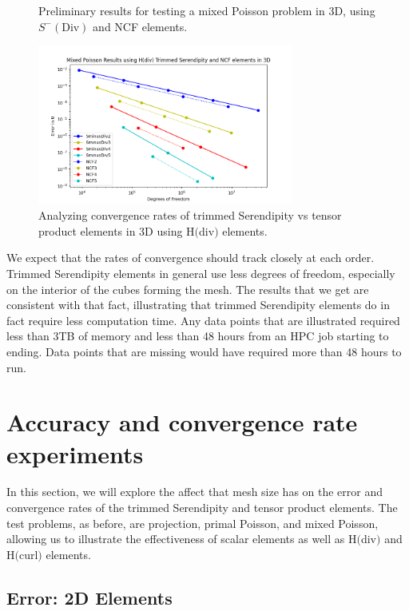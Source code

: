 \documentclass[manuscript,screen]{acmart}
\begin{document}
\begin{figure}[h!]
  \caption{Preliminary results for testing a mixed Poisson problem in 3D, using $S^-(\text{Div})$ and NCF elements.}
  \includegraphics[width=0.75\textwidth]{MixedPoisson3d_TrimmedSerendipityNCF.png}
\caption{Analyzing convergence rates of trimmed Serendipity vs tensor product elements in 3D using H$($div$)$ elements.}
\label{fig:3dTrimmedDiv}
\end{figure}

\noindent We expect that the rates of convergence should track closely at each order.  Trimmed Serendipity elements in general use less degrees of freedom, especially on the interior of the cubes forming the mesh.   The results that we get are consistent with that fact, illustrating that trimmed Serendipity elements do in fact require less computation time. Any data points that are illustrated required less than 3TB of memory and less than 48 hours from an HPC job starting to ending.  Data points that are missing would have required more than 48 hours to run.  


\newpage
\section{Accuracy and convergence rate experiments}

In this section, we will explore the affect that mesh size has on the error and convergence rates of the trimmed Serendipity and tensor product elements. The test problems, as before, are projection, primal Poisson, and mixed Poisson, allowing us to illustrate the effectiveness of scalar elements as well as H$($div$)$ and H$($curl$)$ elements.

\subsection{Error: 2D Elements}
\end{document}
